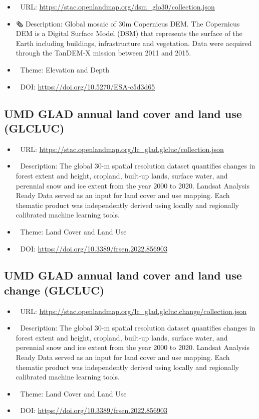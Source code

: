 \documentclass[
  graybox,natbib,nospthms]{svmono}
\providecommand{\tightlist}{%
  \setlength{\itemsep}{0pt}\setlength{\parskip}{0pt}}
\providecommand{\tightlist}{\setlength{\itemsep}{0pt}\setlength{\parskip}{0pt}}
\begin{document}
\begin{itemize}
\tightlist
\item
  🔗 URL: \url{https://stac.openlandmap.org/dsm_glo30/collection.json}
\item
  🗞 Description: Global mosaic of 30m Copernicus DEM. The Copernicus DEM is a Digital Surface Model (DSM) that represents the surface of the Earth including buildings, infrastructure and vegetation. Data were acquired through the TanDEM-X mission between 2011 and 2015.
\item
  📝 Theme: Elevation and Depth
\item
  📂 DOI: \url{https://doi.org/10.5270/ESA-c5d3d65}
\end{itemize}

\hypertarget{umd-glad-annual-land-cover-and-land-use-glcluc}{%
\subsection{UMD GLAD annual land cover and land use (GLCLUC)}\label{umd-glad-annual-land-cover-and-land-use-glcluc}}

\begin{itemize}
\tightlist
\item
  🔗 URL: \url{https://stac.openlandmap.org/lc_glad.glcluc/collection.json}
\item
  📰 Description: The global 30-m spatial resolution dataset quantifies changes in forest extent and height, cropland, built-up lands, surface water, and perennial snow and ice extent from the year 2000 to 2020. Landsat Analysis Ready Data served as an input for land cover and use mapping. Each thematic product was independently derived using locally and regionally calibrated machine learning tools.
\item
  📝 Theme: Land Cover and Land Use
\item
  📂 DOI: \url{https://doi.org/10.3389/frsen.2022.856903}
\end{itemize}

\hypertarget{umd-glad-annual-land-cover-and-land-use-change-glcluc}{%
\subsection{UMD GLAD annual land cover and land use change (GLCLUC)}\label{umd-glad-annual-land-cover-and-land-use-change-glcluc}}

\begin{itemize}
\tightlist
\item
  🔗 URL: \url{https://stac.openlandmap.org/lc_glad.glcluc.change/collection.json}
\item
  📰 Description: The global 30-m spatial resolution dataset quantifies changes in forest extent and height, cropland, built-up lands, surface water, and perennial snow and ice extent from the year 2000 to 2020. Landsat Analysis Ready Data served as an input for land cover and use mapping. Each thematic product was independently derived using locally and regionally calibrated machine learning tools.
\item
  📝 Theme: Land Cover and Land Use
\item
  📂 DOI: \url{https://doi.org/10.3389/frsen.2022.856903}
\end{itemize}
\end{document}
